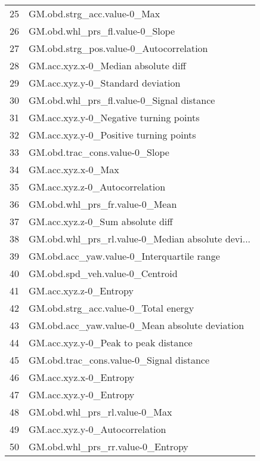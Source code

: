 \begin{tabular}{ll}
25  &                        GM.obd.strg\_acc.value-0\_Max \\
26  &                    GM.obd.whl\_prs\_fl.value-0\_Slope \\
27  &            GM.obd.strg\_pos.value-0\_Autocorrelation \\
28  &                GM.acc.xyz.x-0\_Median absolute diff \\
29  &                  GM.acc.xyz.y-0\_Standard deviation \\
30  &          GM.obd.whl\_prs\_fl.value-0\_Signal distance \\
31  &             GM.acc.xyz.y-0\_Negative turning points \\
32  &             GM.acc.xyz.y-0\_Positive turning points \\
33  &                     GM.obd.trac\_cons.value-0\_Slope \\
34  &                                 GM.acc.xyz.x-0\_Max \\
35  &                     GM.acc.xyz.z-0\_Autocorrelation \\
36  &                     GM.obd.whl\_prs\_fr.value-0\_Mean \\
37  &                   GM.acc.xyz.z-0\_Sum absolute diff \\
38  &  GM.obd.whl\_prs\_rl.value-0\_Median absolute devi... \\
39  &         GM.obd.acc\_yaw.value-0\_Interquartile range \\
40  &                    GM.obd.spd\_veh.value-0\_Centroid \\
41  &                             GM.acc.xyz.z-0\_Entropy \\
42  &               GM.obd.strg\_acc.value-0\_Total energy \\
43  &     GM.obd.acc\_yaw.value-0\_Mean absolute deviation \\
44  &               GM.acc.xyz.y-0\_Peak to peak distance \\
45  &           GM.obd.trac\_cons.value-0\_Signal distance \\
46  &                             GM.acc.xyz.x-0\_Entropy \\
47  &                             GM.acc.xyz.y-0\_Entropy \\
48  &                      GM.obd.whl\_prs\_rl.value-0\_Max \\
49  &                     GM.acc.xyz.y-0\_Autocorrelation \\
50  &                  GM.obd.whl\_prs\_rr.value-0\_Entropy \\

\end{tabular}
